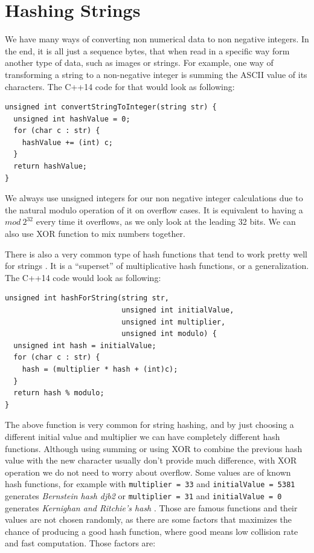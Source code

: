 \section{Hashing Strings}

We have many ways of converting non numerical data to non negative integers. In the end, it is all just a sequence bytes, that when read in a specific way form another type of data, such as images or strings. For example, one way of transforming a string to a non-negative integer is summing the ASCII value of its characters. The C++14 code for that would look as following:

\begin{lstlisting}
unsigned int convertStringToInteger(string str) {
  unsigned int hashValue = 0;
  for (char c : str) {
    hashValue += (int) c;
  }
  return hashValue;
}
\end{lstlisting}

We always use unsigned integers for our non negative integer calculations due to the natural modulo operation of it on overflow cases. It is equivalent to having a \( mod \ 2^{32} \) every time it overflows, as we only look at the leading 32 bits. We can also use XOR function to mix numbers together. 

There is also a very common type of hash functions that tend to work pretty well for strings \citep{DragonHashFunc}. It is a ``superset'' of multiplicative hash functions, or a generalization. The C++14 code would look as following:

\begin{lstlisting}
unsigned int hashForString(string str,
                           unsigned int initialValue,
                           unsigned int multiplier,
                           unsigned int modulo) {
  unsigned int hash = initialValue;
  for (char c : str) {
    hash = (multiplier * hash + (int)c);
  }
  return hash % modulo;
}
\end{lstlisting}

The above function is very common for string hashing, and by just choosing a different initial value and multiplier we can have completely different hash functions. Although using summing or using XOR to combine the previous hash value with the new character usually don't provide much difference, with XOR operation we do not need to worry about overflow. Some values are of known hash functions, for example with \texttt{multiplier = 33} and \texttt{initialValue = 5381} generates \textit{Bernstein hash djb2} \citep{BernsteinHash} or \texttt{multiplier = 31} and \texttt{initialValue = 0} generates \textit{Kernighan and Ritchie's hash} \citep{KernighanHash}. Those are famous functions and their values are not chosen randomly, as there are some factors that maximizes the chance of producing a good hash function, where good means low collision rate and fast computation. Those factors are:


